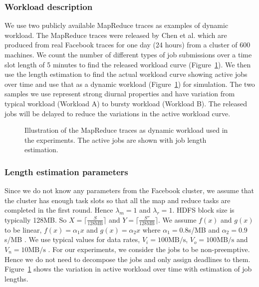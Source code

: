 \documentclass[10pt,conference,compsocconf,letterpaper]{IEEEtran}
\begin{document}
\subsubsection*{Workload description}
We use two publicly available MapReduce traces as examples of dynamic workload. The MapReduce traces were released by Chen et al. \cite{n4} which are produced from real Facebook traces for one day (24 hours) from a cluster of 600 machines. We count the number of different types of job submissions over a time slot length of 5 minutes to find the released workload curve (Figure~\ref{fig:workload}). We then use the length estimation to find the actual workload curve showing active jobs over time and use that as a dynamic workload (Figure~\ref{fig:workload}) for simulation. The two samples we use represent strong diurnal properties and have variation from typical workload (Workload A) to bursty workload (Workload B). The released jobs will be delayed to reduce the variations in the active workload curve.


\begin{figure}[!t]
\centerline{
\hfil
{}}
\caption{Illustration of the MapReduce traces as dynamic workload used in the experiments. The active jobs are shown with job length estimation.}
\label{fig:workload}
\end{figure}


\subsubsection*{Length estimation parameters}
Since we do not know any parameters from the Facebook cluster, we assume that the cluster has enough task slots so that all the map and reduce tasks are completed in the first round. Hence $\lambda_m= 1$ and $\lambda_r =1$. HDFS block size is typically 128MB. So $X = \lceil \frac{S}{128\textrm{MB}} \rceil$ and $Y=\lceil\frac{S''}{128\textrm{MB}}\rceil$. We assume $f(x)$ and $g(x)$ to be linear, $f(x)=\alpha_1 x$ and $g(x)= \alpha_2 x$ where $\alpha_1 = 0.8$s/MB and $\alpha_2 = 0.9$s/MB \cite{Estimation_MapReduce}. We use typical values for data rates, $V_i = 100\textrm{MB/s}$, $V_o = 100\textrm{MB/s}$ and $V_n = 10\textrm{MB/s}$ \cite{n9,Estimation_MapReduce}. For our experiments, we consider the jobs to be non-preemptive. Hence we do not need to decompose the jobs and only assign deadlines to them. Figure~\ref{fig:workload} shows the variation in active workload over time with estimation of job lengths.
\end{document}
